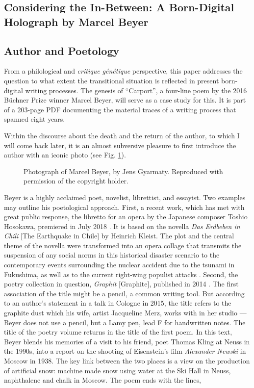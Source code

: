 \begin{paper}
\section*{Considering the In-Between: A Born-Digital Holograph by Marcel Beyer}

\subsection*{Author and Poetology}

From a philological and \emph{critique génétique} perspective, this paper
addresses the question to what extent the transitional situation is
reflected in present born-digital writing processes. The genesis of
``Carport'', a four-line poem by the 2016 Büchner Prize winner Marcel
Beyer, will serve as a case study for this. It is part of a 203-page PDF
documenting the material traces of a writing process that spanned eight
years.

Within the discourse about the death and the return of the author, to
which I will come back later, it is an almost subversive pleasure to first
introduce the author with an iconic photo (see Fig. \ref{fig:wix1}).

\begin{figure}[H]
    \centering
    \caption{Photograph of Marcel Beyer, by Jens Gyarmaty. Reproduced with permission of the copyright holder.}
    \label{fig:wix1}
\end{figure}

Beyer is a highly acclaimed poet, novelist, librettist, and essayist.
Two examples may outline his poetological approach. First, a recent
work, which has met with great public response, the libretto for an
opera by the Japanese composer Toshio Hosokawa, premiered in July 2018
\citep{beyer_libretto_2018}. It is based on the novella \emph{Das Erdbeben in Chili} [The
Earthquake in Chile] by Heinrich Kleist. The plot and the central theme
of the novella were transformed into an opera collage that transmits the
suspension of any social norms in this historical disaster scenario to
the contemporary events surrounding the nuclear accident due to the
tsunami in Fukushima, as well as to the current right-wing populist
attacks \parencite{wix_programmheft_2018}. Second, the poetry collection in question, \emph{Graphit}
[Graphite], published in 2014 \citep{beyer_graphit_2014}. The first association of
the title might be a pencil, a common writing tool. But according to an
author's statement in a talk in Cologne in 2015, the title refers to the
graphite dust which his wife, artist Jacqueline Merz, works with in her
studio –– Beyer does not use a pencil, but a Lamy pen, lead F for
handwritten notes. The title of the poetry volume returns in the title
of the first poem. In this text, Beyer blends his memories of a visit to
his friend, poet Thomas Kling at Neuss in the 1990s, into a report on
the shooting of Eisenstein's film \emph{Alexander Newski} in Moscow in
1938. The key link between the two places is a view on the production of
artificial snow: machine made snow using water at the Ski Hall in
Neuss, naphthalene and chalk in Moscow. The poem ends with the lines,


\end{paper}
